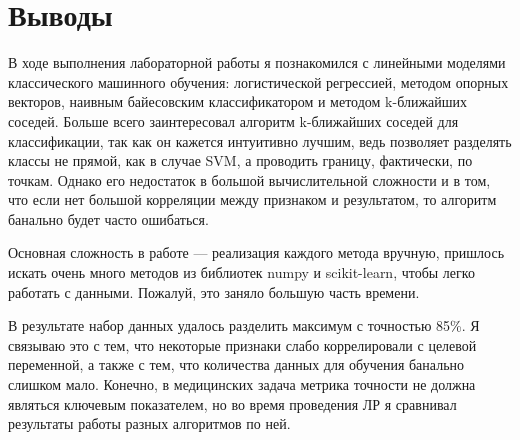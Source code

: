 \section{Выводы}
В ходе выполнения лабораторной работы я познакомился с линейными моделями классического машинного обучения: логистической регрессией, 
методом опорных векторов, наивным байесовским классификатором и методом k-ближайших соседей. Больше всего заинтересовал алгоритм 
k-ближайших соседей для классификации, так как он кажется интуитивно лучшим, ведь позволяет разделять классы не прямой, как в случае SVM,
а проводить границу, фактически, по точкам. Однако его недостаток в большой вычислительной сложности и в том, что если нет большой корреляции 
между признаком и результатом, то алгоритм банально будет часто ошибаться.

Основная сложность в работе --- реализация каждого метода вручную, пришлось искать очень много методов из библиотек numpy и scikit-learn, 
чтобы легко работать с данными. Пожалуй, это заняло большую часть времени.

В результате набор данных удалось разделить максимум с точностью 85\%. Я связываю это с тем, что некоторые признаки слабо коррелировали с целевой
переменной, а также с тем, что количества данных для обучения банально слишком мало. Конечно, в медицинских задача метрика точности
не должна являться ключевым показателем, но во время проведения ЛР я сравнивал результаты работы разных алгоритмов по ней.
\pagebreak
